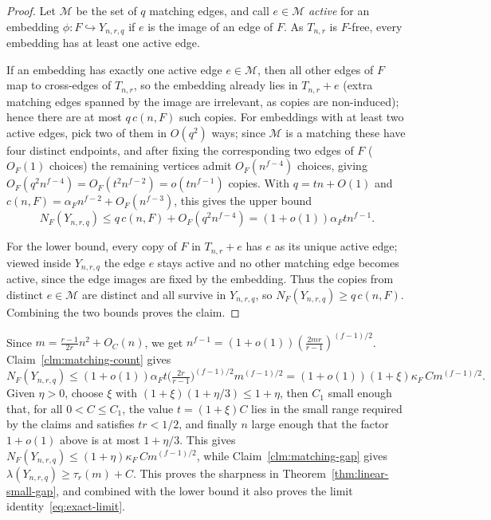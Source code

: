 \documentclass[11pt,a4paper]{article}
\theoremstyle{definition}
\theoremstyle{plain}
\newcommand{\Ksharp}{\kappa_{F}}
\renewcommand{\le}{\leqslant}
\renewcommand{\ge}{\geqslant}
\begin{document}
\begin{proof}
Let $\mathcal M$ be the set of $q$ matching edges, and call $e\in\mathcal M$ \emph{active} for an embedding $\phi\colon F\hookrightarrow Y_{n,r,q}$ if $e$ is the image of an edge of $F$.  As $T_{n,r}$ is $F$-free, every embedding has at least one active edge.

If an embedding has exactly one active edge $e\in\mathcal M$, then all other edges of $F$ map to cross-edges of $T_{n,r}$, so the embedding already lies in $T_{n,r}+e$ (extra matching edges spanned by the image are irrelevant, as copies are non-induced); hence there are at most $q\,c(n,F)$ such copies.  For embeddings with at least two active edges, pick two of them in $O(q^2)$ ways; since $\mathcal M$ is a matching these have four distinct endpoints, and after fixing the corresponding two edges of $F$ ($O_F(1)$ choices) the remaining vertices admit $O_F(n^{f-4})$ choices, giving $O_F(q^2n^{f-4})=O_F(t^2n^{f-2})=o(tn^{f-1})$ copies.  With $q=tn+O(1)$ and $c(n,F)=\alpha_Fn^{f-2}+O_F(n^{f-3})$, this gives the upper bound 
$$ N_F (Y_{n,r,q})\le q\,c(n,F)+O_F(q^2n^{f-4})=(1+o(1))\alpha_F t n^{f-1}.$$

For the lower bound, every copy of $F$ in $T_{n,r}+e$ has $e$ as its unique active edge; viewed inside $Y_{n,r,q}$ the edge $e$ stays active and no other matching edge becomes active, since the edge images are fixed by the embedding.  Thus the copies from distinct $e\in\mathcal M$ are distinct and all survive in $Y_{n,r,q}$, so $ N_F (Y_{n,r,q})\ge q\,c(n,F)$.  Combining the two bounds proves the claim.
\end{proof}

Since $m\!=\!\tfrac{r-1}{2r}n^2+O_C(n)$, 
we get $n^{f-1}\!=\! (1\!+\! o(1)) (\tfrac{2mr}{r-1} )^{(f-1)/2}$. 
 Claim~\ref{clm:matching-count} gives 
\[
   N_F (Y_{n,r,q})
  \le(1+o(1))\alpha_F t\Big(\tfrac{2r}{r-1}\Big)^{(f-1)/2}m^{(f-1)/2}
  =(1+o(1))(1+\xi)\Ksharp\,C m^{(f-1)/2}.
\]
Given $\eta>0$, choose $\xi$ with $(1+\xi)(1+\eta/3)\le1+\eta$, then $C_1$ small enough that, for all $0<C\le C_1$, the value $t=(1+\xi)C$ lies in the small range required by the claims and satisfies $tr<1/2$, and finally $n$ large enough that the factor $1+o(1)$ above is at most $1+\eta/3$.  This gives $ N_F (Y_{n,r,q})\le(1+\eta)\Ksharp\,C m^{(f-1)/2}$, while Claim~\ref{clm:matching-gap} gives $\lambda(Y_{n,r,q})\ge\tau_r(m)+C$.  This proves the sharpness in Theorem~\ref{thm:linear-small-gap}, and combined with the lower bound it also proves the limit identity~\eqref{eq:exact-limit}.
\end{document}
